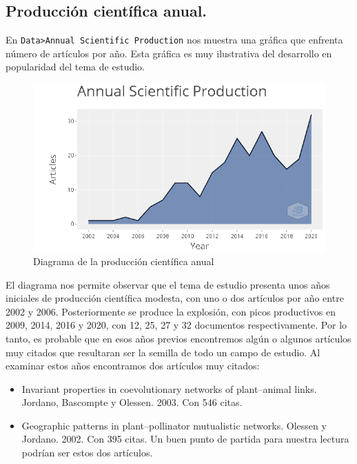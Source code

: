 \documentclass[
]{article}
\providecommand{\tightlist}{%
  \setlength{\itemsep}{0pt}\setlength{\parskip}{0pt}}
\begin{document}
\hypertarget{producciuxf3n-cientuxedfica-anual.}{%
\subsection{Producción científica
anual.}\label{producciuxf3n-cientuxedfica-anual.}}

En \texttt{Data\textgreater{}Annual\ Scientific\ Production} nos muestra
una gráfica que enfrenta número de artículos por año. Esta gráfica es
muy ilustrativa del desarrollo en popularidad del tema de estudio.

\begin{figure}
\centering
\includegraphics{AnnualScientificProduction.png}
\caption{Diagrama de la producción científica anual}
\end{figure}

El diagrama nos permite observar que el tema de estudio presenta unos
años iniciales de producción científica modesta, con uno o dos artículos
por año entre 2002 y 2006. Posteriormente se produce la explosión, con
picos productivos en 2009, 2014, 2016 y 2020, con 12, 25, 27 y 32
documentos respectivamente. Por lo tanto, es probable que en esos años
previos encontremos algún o algunos artículos muy citados que resultaran
ser la semilla de todo un campo de estudio. Al examinar estos años
encontramos dos artículos muy citados:

\begin{itemize}
\tightlist
\item
  Invariant properties in coevolutionary networks of plant--animal
  links. Jordano, Bascompte y Olessen. 2003. Con 546 citas.
\item
  Geographic patterns in plant--pollinator mutualistic networks. Olessen
  y Jordano. 2002. Con 395 citas. Un buen punto de partida para nuestra
  lectura podrían ser estos dos artículos.
\end{itemize}
\end{document}
